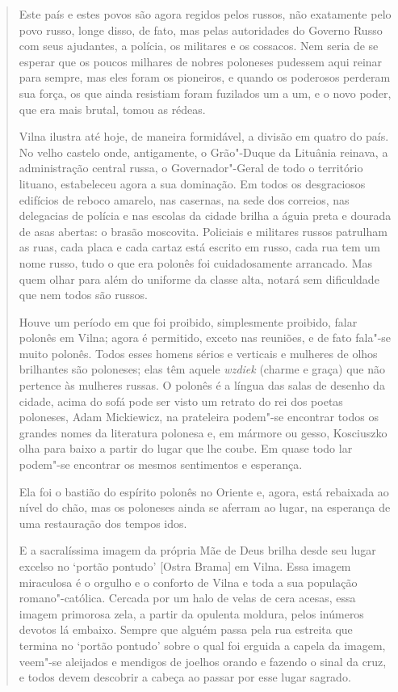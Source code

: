 \begin{quote}
Este país e estes povos são agora regidos pelos russos, não exatamente
pelo povo russo, longe disso, de fato, mas pelas autoridades do Governo
Russo com seus ajudantes, a polícia, os militares e os cossacos. Nem
seria de se esperar que os poucos milhares de nobres poloneses pudessem
aqui reinar para sempre, mas eles foram os pioneiros, e quando os
poderosos perderam sua força, os que ainda resistiam foram fuzilados um
a um, e o novo poder, que era mais brutal, tomou as rédeas.

Vilna ilustra até hoje, de maneira formidável, a divisão em quatro do
país. No velho castelo onde, antigamente, o Grão"-Duque da Lituânia
reinava, a administração central russa, o Governador"-Geral de todo o
território lituano, estabeleceu agora a sua dominação. Em todos os
desgraciosos edifícios de reboco amarelo, nas casernas, na sede dos
correios, nas delegacias de polícia e nas escolas da cidade brilha a
águia preta e dourada de asas abertas: o brasão moscovita. Policiais e
militares russos patrulham as ruas, cada placa e cada cartaz está
escrito em russo, cada rua tem um nome russo, tudo o que era polonês foi
cuidadosamente arrancado. Mas quem olhar para além do uniforme da classe
alta, notará sem dificuldade que nem todos são russos.

Houve um período em que foi proibido, simplesmente proibido, falar
polonês em Vilna; agora é permitido, exceto nas reuniões, e de fato
fala"-se muito polonês. Todos esses homens sérios e verticais e mulheres
de olhos brilhantes são poloneses; elas têm aquele \textit{wzdiek} (charme e
graça) que não pertence às mulheres russas. O polonês é a língua das
salas de desenho da cidade, acima do sofá pode ser visto um retrato do
rei dos poetas poloneses, Adam Mickiewicz, na prateleira podem"-se
encontrar todos os grandes nomes da literatura polonesa e, em mármore ou
gesso, Kosciuszko olha para baixo a partir do lugar que lhe coube. Em
quase todo lar podem"-se encontrar os mesmos sentimentos e esperança.

Ela foi o bastião do espírito polonês no Oriente e, agora, está
rebaixada ao nível do chão, mas os poloneses ainda se aferram ao lugar,
na esperança de uma restauração dos tempos idos.

E a sacralíssima imagem da própria Mãe de Deus brilha desde seu lugar
excelso no `portão pontudo' {[}Ostra Brama{]} em Vilna. Essa imagem
miraculosa é o orgulho e o conforto de Vilna e toda a sua população
romano"-católica. Cercada por um halo de velas de cera acesas, essa
imagem primorosa zela, a partir da opulenta moldura, pelos inúmeros
devotos lá embaixo. Sempre que alguém passa pela rua estreita que
termina no `portão pontudo' sobre o qual foi erguida a capela da imagem,
veem"-se aleijados e mendigos de joelhos orando e fazendo o sinal da
cruz, e todos devem descobrir a cabeça ao passar por esse lugar sagrado.


\end{quote}
